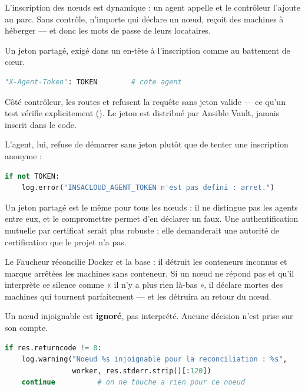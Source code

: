 \menace
L'inscription des nœuds est dynamique : un agent appelle
 et le contrôleur l'ajoute au parc. Sans contrôle,
n'importe qui déclare un nœud, reçoit des machines à héberger --- et donc les
mots de passe de leurs locataires.

\parade
Un jeton partagé, exigé dans un en-tête à l'inscription comme au battement de
cœur.

\danslecode
\begin{lstlisting}[language=Python]
"X-Agent-Token": TOKEN        # cote agent
\end{lstlisting}

Côté contrôleur, les routes  et 
refusent la requête sans jeton valide --- ce qu'un test vérifie
explicitement (). Le jeton
est distribué par Ansible Vault, jamais inscrit dans le code.

L'agent, lui, refuse de démarrer sans jeton plutôt que de tenter une
inscription anonyme :

\begin{lstlisting}[language=Python]
if not TOKEN:
    log.error("INSACLOUD_AGENT_TOKEN n'est pas defini : arret.")
\end{lstlisting}

\limite
Un jeton partagé est le même pour tous les nœuds : il ne distingue pas les
agents entre eux, et le compromettre permet d'en déclarer un faux. Une
authentification mutuelle par certificat serait plus robuste ; elle demanderait
une autorité de certification que le projet n'a pas.


\menace
Le Faucheur réconcilie Docker et la base : il détruit les conteneurs inconnus
et marque arrêtées les machines sans conteneur. Si un nœud ne répond pas et
qu'il interprète ce silence comme « il n'y a plus rien là-bas », il déclare
mortes des machines qui tournent parfaitement --- et les détruira au retour du
nœud.

\parade
Un nœud injoignable est \textbf{ignoré}, pas interprété. Aucune décision n'est
prise sur son compte.

\danslecode
\begin{lstlisting}[language=Python]
if res.returncode != 0:
    log.warning("Noeud %s injoignable pour la reconciliation : %s",
                worker, res.stderr.strip()[:120])
    continue          # on ne touche a rien pour ce noeud
\end{lstlisting}

